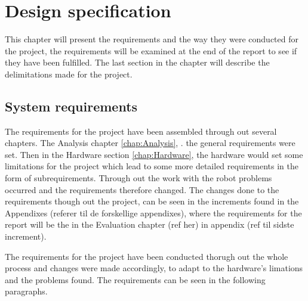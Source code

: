\chapter{Design specification}
\label{chap:Design specification}
This chapter will present the requirements and the way they were conducted for the project, the requirements will be examined at the end of the report to see if they have been fulfilled. The last section in the chapter will describe the delimitations made for the project.

\section{System requirements}
\label{sec:System requirements}
The requirements for the project have been assembled through out several chapters. The Analysis chapter \ref{chap:Analysis}, . the general requirements were set. Then in the Hardware section \ref{chap:Hardware}, the hardware would set some limitations for the project which lead to some more detailed requirements in the form of subrequirements.
Through out the work with the robot problems occurred and the requirements therefore changed. The changes done to the requirements though out the project, can be seen in the increments found in the Appendixes (referer til de forskellige appendixes), where the requirements for the report will be the in the Evaluation chapter (ref her) in appendix (ref til sidste increment).

The requirements for the project have been conducted thorugh out the whole process and changes were made accordingly, to adapt to the hardware's limations and the problems found. The requirements can be seen in the following paragraphs. 

